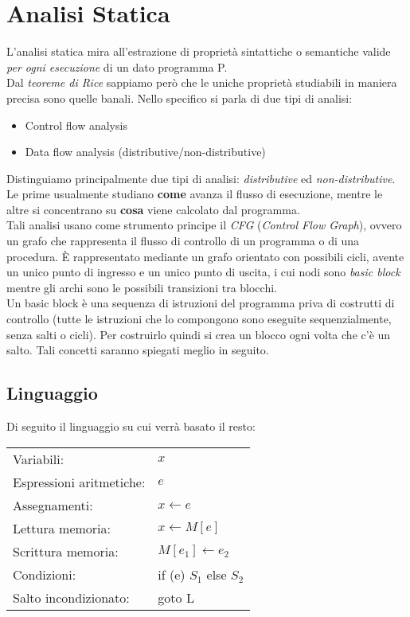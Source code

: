 \documentclass[a4paper,12pt,openany]{article}
\begin{document}

\newpage
\section{Analisi Statica}

L'analisi statica mira all'estrazione di proprietà sintattiche o semantiche valide \emph{per ogni esecuzione} di un dato programma P.\\
Dal \emph{teoreme di Rice} sappiamo però che le uniche proprietà studiabili in maniera precisa sono quelle
banali. Nello specifico si parla di due tipi di analisi:
\begin{itemize}
	\item Control flow analysis
	\item Data flow analysis (distributive/non-distributive)
\end{itemize}Distinguiamo principalmente due tipi di analisi: \emph{distributive} ed \emph{non-distributive}. Le prime usualmente studiano \textbf{come} avanza il flusso di esecuzione, mentre le altre si concentrano su \textbf{cosa} viene calcolato dal programma.\\
Tali analisi usano come strumento principe il \emph{CFG} (\emph{Control Flow Graph}), ovvero un grafo che rappresenta il flusso di controllo di un programma o di una procedura. È rappresentato mediante un grafo orientato con possibili cicli, avente un unico punto di ingresso e un unico punto di uscita, i cui nodi sono \emph{basic block} mentre gli archi sono le possibili transizioni tra blocchi.\\
Un basic block è una sequenza di istruzioni del programma priva di costrutti di controllo (tutte le istruzioni che lo compongono sono eseguite sequenzialmente, senza salti o cicli). Per costruirlo quindi si crea un blocco ogni volta che c'è un salto. Tali concetti saranno spiegati meglio in seguito.

\subsection{Linguaggio}
Di seguito il linguaggio su cui verrà basato il resto:
\begin{center}
	\begin{tabular}{l l}
		Variabili: &  $x$ \\
		Espressioni aritmetiche: & $e$ \\
		Assegnamenti: & $x \gets e$ \\
		Lettura memoria: & $x \gets M[e]$ \\
		Scrittura memoria: & $M[e_1] \gets e_2$ \\
		Condizioni: & if (e) $S_1$ else $S_2$ \\
		Salto incondizionato: & goto L\\
	\end{tabular}
\end{center}
\end{document}
